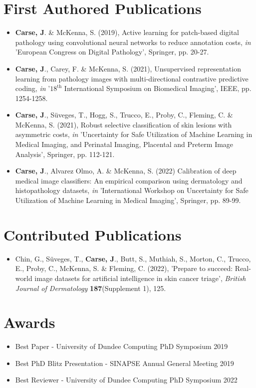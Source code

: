 \section{First Authored Publications}
\label{sec:first_authored_publications}

\begin{itemize}
	\item \textbf{Carse, J}. \& McKenna, S. (2019), Active learning for patch-based digital pathology using convolutional neural networks to reduce annotation costs, \textit{in} 'European Congress on Digital Pathology', Springer, pp. 20-27. 
	
	\item \textbf{Carse, J}., Carey, F. \&  McKenna, S. (2021), Unsupervised representation learning from pathology images with multi-directional contrastive predictive coding, \textit{in} '$18^{\text{th}}$ International Symposium on Biomedical Imaging', IEEE, pp. 1254-1258.
	
	\item \textbf{Carse, J}., S\"{u}veges, T., Hogg, S., Trucco, E., Proby, C., Fleming, C. \& McKenna, S. (2021), Robust selective classification of skin lesions with asymmetric costs, \textit{in} 'Uncertainty for Safe Utilization of Machine Learning in Medical Imaging, and Perinatal Imaging, Placental and Preterm Image Analysis', Springer, pp. 112-121.
	
	\item \textbf{Carse, J}., Alvarez Olmo, A. \& McKenna, S. (2022) Calibration of deep medical image classifiers: An empirical comparison using dermatology and histopathology datasets, \textit{in} 'International Workshop on Uncertainty for Safe Utilization of Machine Learning in Medical Imaging', Springer, pp. 89-99.
\end{itemize}



\section{Contributed Publications}
\label{sec:contributed_publications}

\begin{itemize}
	\item Chin, G.,  S\"{u}veges, T., \textbf{Carse, J}., Butt, S., Muthiah, S., Morton, C., Trucco, E., Proby, C., McKenna, S. \& Fleming, C. (2022), 'Prepare to succeed: Real-world image datasets for artificial intelligence in skin cancer triage', \textit{British Journal of Dermatology} \textbf{187}(Supplement 1), 125.
\end{itemize}



\section{Awards}
\label{sec:awards}

\begin{itemize}
	\item Best Paper - University of Dundee Computing PhD Symposium 2019
	\item Best PhD Blitz Presentation - SINAPSE Annual General Meeting 2019
	\item Best Reviewer - University of Dundee Computing PhD Symposium 2022
\end{itemize}